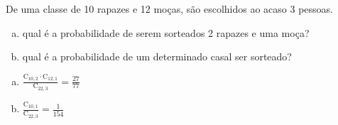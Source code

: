 \begin{ex}
De uma classe de  10 rapazes e 12 moças, são escolhidos ao acaso 3 pessoas.
  \begin{enumerate} [(a)]
 	    \item  qual é a probabilidade de serem sorteados 2 rapazes e uma moça?
 	    \item qual é a probabilidade de um determinado casal ser sorteado?
  \end{enumerate}
 	      \begin{sol}
 	         \phantom{A}
 	        \begin{enumerate} [(a)]
 	            \item $\frac{\mathrm{C}_{{10},2}\cdot\mathrm{C}_{{12},1}}{\mathrm{C}_{{22},3}}=\frac{27}{77}$
 	            \item $\frac{\mathrm{C}_{{10},1}}{\mathrm{C}_{{22},3}}=\frac{1}{154}$
 	        \end{enumerate}
 	      \end{sol}
 

\end{ex}